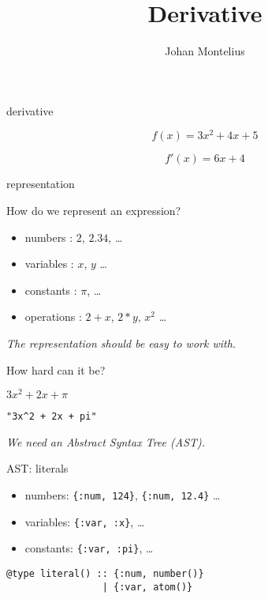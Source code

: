 

\title[ID1019 Derivative]{Derivative}


\author{Johan Montelius}
\date{\semester}



\begin{frame}
\titlepage
\end{frame}

\begin{frame}{derivative}

$$f(x) =  3x^2 + 4x + 5$$
\pause 

$$f'(x) =  6x + 4$$
\end{frame}


\begin{frame}{representation}

  How do we represent an expression? \pause

  \begin{itemize}
  \item numbers : $2$, $2.34$, \ldots \pause
  \item variables : $x$, $y$ \ldots \pause
  \item constants : $\pi$, \ldots \pause
  \item operations :  $2 + x$, $2 * y$, $x^2$ \ldots \pause
  \end{itemize}

  \vspace{10pt}
  {\em The representation should be easy to work with.}
\end{frame}

\begin{frame}[fragile]{How hard can it be?}

  $3x^2 + 2x + \pi$ \pause

  \vspace{20pt}
  {\tt "3x\^{}2 + 2x + pi"} \pause

  \vspace{20pt}
  {\em We need an Abstract Syntax Tree (AST).}
\end{frame}

\begin{frame}[fragile]{AST: literals}

  \begin{itemize}
  \item numbers: {\tt \{:num, 124\}}, {\tt \{:num, 12.4\}} \ldots \pause
  \item variables: {\tt \{:var, :x\}}, \ldots \pause
  \item constants: {\tt \{:var, :pi\}}, \ldots 
  \end{itemize}
  
\vspace{20pt}  \pause

\begin{verbatim}
@type literal() :: {:num, number()} 
                 | {:var, atom()}
\end{verbatim}


\end{frame}

